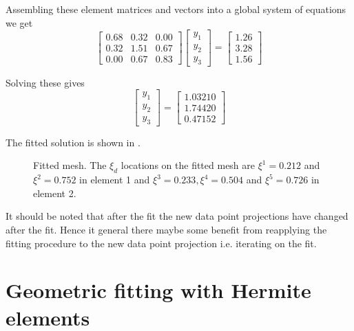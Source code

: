 Assembling these element matrices and vectors into a global system of
equations we get
\begin{equation}
  \begin{bmatrix}
    0.68 & 0.32 & 0.00 \\
    0.32 & 1.51 & 0.67 \\
    0.00 & 0.67 & 0.83 
  \end{bmatrix}
  \begin{bmatrix}
    y_{1} \\
    y_{2} \\
    y_{3}
  \end{bmatrix} =
  \begin{bmatrix}
    1.26 \\
    3.28 \\
    1.56
  \end{bmatrix}
\end{equation}

Solving these gives
\begin{equation}
  \begin{bmatrix}
    y_{1} \\
    y_{2} \\
    y_{3}
  \end{bmatrix} =
  \begin{bmatrix}
    1.03210 \\
    1.74420 \\
    0.47152
  \end{bmatrix}
\end{equation}

The fitted solution is shown in .
\begin{figure}[htpb] \centering
  \caption{Fitted mesh. The $\xi_{d}$ locations on the fitted mesh are
    $\xi^{1}=0.212$ and $\xi^{2}=0.752$ in element 1 and $\xi^{3}=0.233,
    \xi^{4}=0.504$ and $\xi^{5}=0.726$ in element 2.}
  \label{fig:fixedxifitafter}
\end{figure}
It should be noted that after the fit the new data point projections have
changed after the fit. Hence it general there maybe some benefit from
reapplying the fitting procedure to the new data point projection i.e. 
iterating on the fit.

\section{Geometric fitting with Hermite elements}

